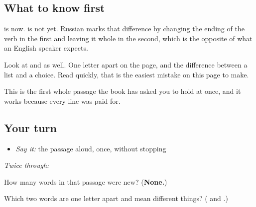 \subsection*{What to know first}
\textbf{ } is now. \textbf{  } is not yet. Russian marks that difference by changing the ending of the verb in the first and leaving it whole in the second, which is the opposite of what an English speaker expects.

Look at \textbf{} and \textbf{} as well. One letter apart on the page, and the difference between a list and a choice. Read quickly, that is the easiest mistake on this page to make.

This is the first whole passage the book has asked you to hold at once, and it works because every line was paid for.

\subsection*{Your turn}
\begin{itemize}
\raggedright
  \item \emph{Say it:} the passage aloud, once, without stopping
\end{itemize}

\emph{Twice through:}

\begin{tcolorbox}[breakable,colback=teal!4,colframe=teal!35!black,title={Before you move on}]
How many words in that passage were new? (\textbf{None.})

Which two words are one letter apart and mean different things? (\textbf{} and \textbf{}.)
\end{tcolorbox}

